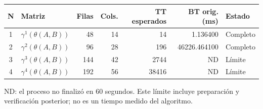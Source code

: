 \begin{tabular}{c l r r r r l}
\toprule
N & Matriz & Filas & Cols. & TT esperados & BT orig. (ms) & Estado \\
\midrule
1 & $\gamma^{1}(\theta(A,B))$ & 48 & 14 & 14 & 1.136400 & Completo \\
2 & $\gamma^{2}(\theta(A,B))$ & 96 & 28 & 196 & 46226.464100 & Completo \\
3 & $\gamma^{3}(\theta(A,B))$ & 144 & 42 & 2744 & ND & Límite \\
4 & $\gamma^{4}(\theta(A,B))$ & 192 & 56 & 38416 & ND & Límite \\
\bottomrule
\end{tabular}
{\footnotesize ND: el proceso no finalizó en 60 segundos. Este límite incluye preparación y verificación posterior; no es un tiempo medido del algoritmo.\par}
